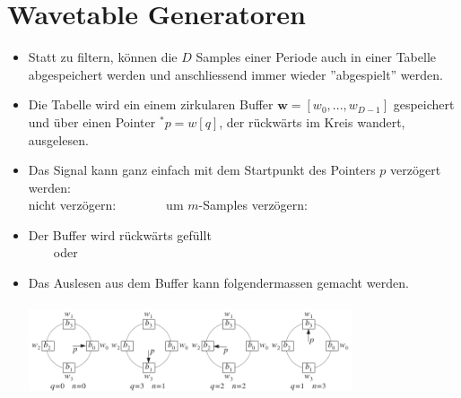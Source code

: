 \section{Wavetable Generatoren}
	\begin{itemize}
	 \item Statt zu filtern, können die $D$ Samples einer Periode auch in einer Tabelle abgespeichert werden und anschliessend immer wieder ''abgespielt'' werden.\\[-0.4cm]
	 \item Die Tabelle wird ein einem zirkularen Buffer $\bm{w} = [w_0,...,w_{D-1}]$ gespeichert und über einen Pointer $^*p = w[q]$, der rückwärts im Kreis wandert, ausgelesen.\\[-0.4cm]
	 \item Das Signal kann ganz einfach mit dem Startpunkt des Pointers $p$ verzögert werden:\\[0.1cm]
	 nicht verzögern:$\qquad$$\qquad$um $m$-Samples verzögern:$\qquad$\\[-0.4cm]
	 \item Der Buffer wird rückwärts gefüllt\\[0.15cm]
	 $\qquad$oder$\qquad$\\[-0.0cm]
	 \item Das Auslesen aus dem Buffer kann folgendermassen gemacht werden.\\[0.15cm]
	 \\[-3.2cm]
	 \hspace*{4.6cm}\includegraphics[width = 0.75\textwidth]{pic/wavetable4.pdf}\\[-0.2cm]
	\end{itemize}

